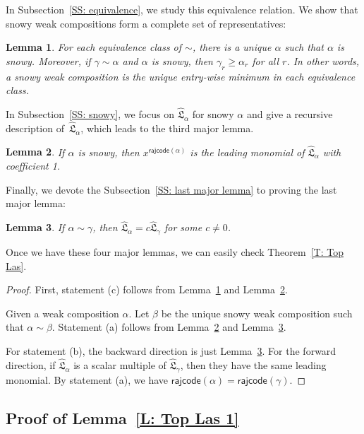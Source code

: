 \documentclass[10pt]{amsart}
\theoremstyle{plain}
\theoremstyle{plain}
\theoremstyle{definition}
\theoremstyle{definition}
\theoremstyle{definition}
\theoremstyle{plain}
\theoremstyle{plain}
\theoremstyle{plain}
\newtheorem{lemma}[lemma]{Lemma}
\theoremstyle{plain}
\theoremstyle{plain}
\theoremstyle{remark}
\theoremstyle{remark}
\theoremstyle{plain}
\theoremstyle{plain}
\newcommand{\fL}{\mathfrak{L}}
\newcommand{\topLas}{\widehat{\fL}}
\newcommand{\rajcode}{\mathsf{rajcode}}
\begin{document}
In Subsection~\ref{SS: equivalence},
we study this equivalence relation.
We show that snowy weak compositions form a complete set of representatives:

\begin{lemma}
\label{L: snowy weak composition in equivalence class}
For each equivalence class of $\sim$, 
there is a unique $\alpha$ such that $\alpha$ is snowy. 
Moreover, if $\gamma \sim \alpha$ and $\alpha$ is snowy, 
then $\gamma_r \geqslant \alpha_r$ for all $r$.
In other words, a snowy weak composition is the
unique entry-wise minimum in each equivalence class. 
\end{lemma}


In Subsection~\ref{SS: snowy}, 
we focus on $\topLas_\alpha$ for snowy $\alpha$ and give a recursive description of~$\topLas_\alpha$,
which leads to the third major lemma.

\begin{lemma}
\label{L: snowy leading}
If $\alpha$ is snowy, 
then $x^{\rajcode(\alpha)}$ is the leading monomial of 
$\topLas_\alpha$ with coefficient 1.
\end{lemma}
Finally, we devote the Subsection~\ref{SS: last major lemma} to proving the last
major lemma:

\begin{lemma}
\label{L: Top Las similar}
If $\alpha \sim \gamma$, 
then $\topLas_\alpha = c\topLas_\gamma$ for some $c \neq 0$.
\end{lemma}

Once we have these four major lemmas, 
we can easily check Theorem~\ref{T: Top Las}.


\begin{proof}
First, statement (c) follows from Lemma~\ref{L: snowy weak composition in equivalence class} and Lemma~\ref{L: snowy leading}. 

Given a weak composition $\alpha$. Let $\beta$ be the unique snowy weak composition such that $\alpha \sim \beta$. Statement (a) follows from  Lemma~\ref{L: snowy leading} and Lemma~\ref{L: Top Las similar}.

For statement (b), the backward direction is just Lemma~\ref{L: Top Las similar}.
For the forward direction, 
if $\topLas_\alpha$ is a scalar multiple of $\topLas_\gamma$,
then they have the same leading monomial.
By statement (a), we have $\rajcode(\alpha) = \rajcode(\gamma)$.
\end{proof}


\subsection{Proof of Lemma~\ref{L: Top Las 1}}
\label{SS: Top Las: Exist}
\end{document}
